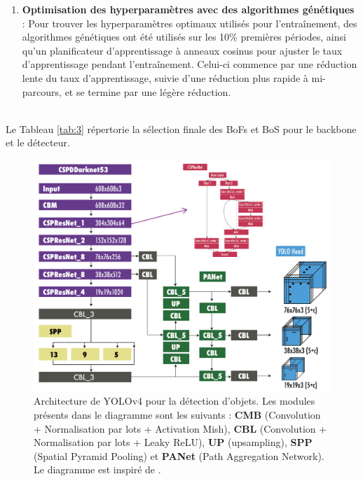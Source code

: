 \documentclass{article}
\begin{document}
\begin{enumerate}
    \item \textbf{Optimisation des hyperparamètres avec des algorithmes génétiques} : Pour trouver les hyperparamètres optimaux utilisés pour l'entraînement, des algorithmes génétiques ont été utilisés sur les 10\% premières périodes, ainsi qu'un planificateur d'apprentissage à anneaux cosinus \cite{70} pour ajuster le taux d'apprentissage pendant l'entraînement. Celui-ci commence par une réduction lente du taux d'apprentissage, suivie d'une réduction plus rapide à mi-parcours, et se termine par une légère réduction.
\end{enumerate}
\vspace{.2cm}\\
Le Tableau \ref{tab:3} répertorie la sélection finale des BoFs et BoS pour le backbone et le détecteur.


\begin{figure}[htbp]
    \centering
    \includegraphics[scale=0.3]{Figures/v4.png}
    \caption{Architecture de YOLOv4 pour la détection d'objets. Les modules présents dans le diagramme sont les suivants : \textbf{CMB} (Convolution + Normalisation par lots + Activation Mish), \textbf{CBL} (Convolution + Normalisation par lots + Leaky ReLU), \textbf{UP} (upsampling), \textbf{SPP} (Spatial Pyramid Pooling) et \textbf{PANet} (Path Aggregation Network). Le diagramme est inspiré de \cite{71}.}
    \label{fig:v4}
\end{figure}
\vspace{0.6cm}
\end{document}
